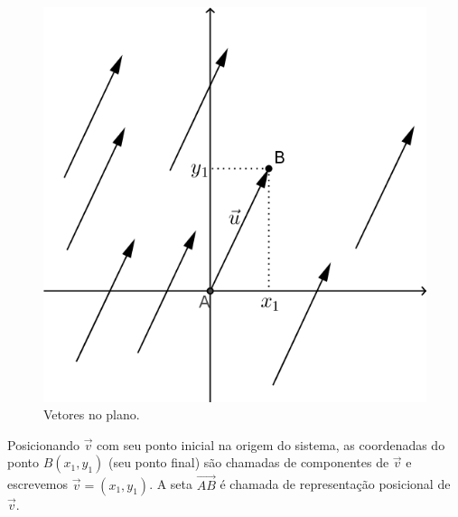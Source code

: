 \begin{figure}[H]
\centering
\includegraphics[scale=1.2]{analitica/imagens/vetor5.png}
\caption{Vetores no plano.}
\label{fig:vetorplano}
\end{figure}

Posicionando $\vec{v}$ com seu ponto inicial na origem do sistema, as coordenadas do ponto $B(x_1, y_1)$ (seu ponto final) são chamadas de componentes de $\vec{v}$ e escrevemos $\vec{v}=(x_1, y_1)$. A seta $\overrightarrow{AB}$ é chamada de representação posicional de $\vec{v}$.


